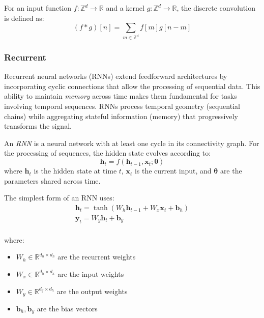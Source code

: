 \begin{definition}\label{def:convolucion_discreta}
	For an input function $f: \mathbb{Z}^d \to \mathbb{R}$ and a kernel $g: \mathbb{Z}^d \to \mathbb{R}$, the discrete convolution is defined as:
	\[
	(f * g)[n] = \sum_{m \in \mathbb{Z}^d} f[m] g[n - m]
	\]
\end{definition}

\subsubsection{Recurrent}\label{subsubsec:rnn}

Recurrent neural networks (\glspl{RNN}) extend feedforward architectures by incorporating cyclic connections that allow the processing of sequential data. This ability to maintain \textit{memory} across time makes them fundamental for tasks involving temporal sequences. \glspl{RNN} process temporal geometry (sequential chains) while aggregating stateful information (memory) that progressively transforms the signal.

\begin{definition}\label{def:rnn}
	An \textit{\gls{RNN}} is a neural network with at least one cycle in its connectivity graph. For the processing of sequences, the hidden state evolves according to:
	\[
	\mathbf{h}_t = f(\mathbf{h}_{t-1}, \mathbf{x}_t; \boldsymbol{\theta})
	\]
	where $\mathbf{h}_t$ is the hidden state at time $t$, $\mathbf{x}_t$ is the current input, and $\boldsymbol{\theta}$ are the parameters shared across time.
\end{definition}

The simplest form of an \gls{RNN} uses:
\begin{gather*}
    \mathbf{h}_t = \tanh(W_h \mathbf{h}_{t-1} + W_x \mathbf{x}_t + \mathbf{b}_h)\\
    \mathbf{y}_t = W_y \mathbf{h}_t + \mathbf{b}_y\\
\end{gather*}

where:
\begin{itemize}
	\item $W_h \in \mathbb{R}^{d_h \times d_h}$ are the recurrent weights
	\item $W_x \in \mathbb{R}^{d_h \times d_x}$ are the input weights
	\item $W_y \in \mathbb{R}^{d_y \times d_h}$ are the output weights
	\item $\mathbf{b}_h, \mathbf{b}_y$ are the bias vectors
\end{itemize}

